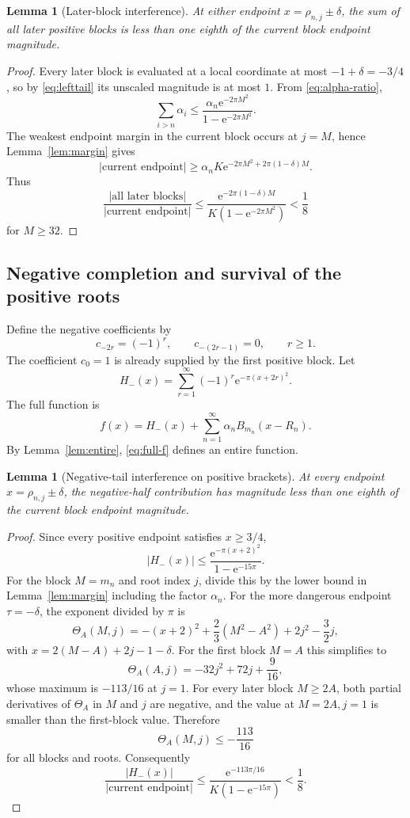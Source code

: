 \documentclass[11pt]{article}
\newtheorem{lemma}[theorem]{Lemma}
\newcommand{\e}{\mathrm{e}}
\begin{document}
\begin{lemma}[Later-block interference]\label{lem:later}
At either endpoint $x=\rho_{n,j}\pm\delta$, the sum of all later positive blocks is less than one eighth of the current block endpoint magnitude.
\end{lemma}

\begin{proof}
Every later block is evaluated at a local coordinate at most $-1+\delta=-3/4$, so by \eqref{eq:lefttail} its unscaled magnitude is at most $1$. From \eqref{eq:alpha-ratio},
\[
 \sum_{i>n}\alpha_i
 \le\frac{\alpha_n\e^{-2\pi M^2}}{1-\e^{-2\pi M^2}}.
\]
The weakest endpoint margin in the current block occurs at $j=M$, hence Lemma~\ref{lem:margin} gives
\[
 |\text{current endpoint}|\ge
 \alpha_nK\e^{-2\pi M^2+2\pi(1-\delta)M}.
\]
Thus
\[
 \frac{|\text{all later blocks}|}{|\text{current endpoint}|}
 \le
 \frac{\e^{-2\pi(1-\delta)M}}{K(1-\e^{-2\pi M^2})}<\frac18
\]
for $M\ge32$.
\end{proof}

\subsection{Negative completion and survival of the positive roots}
Define the negative coefficients by
\begin{equation}\label{eq:negative-c}
 c_{-2r}=(-1)^r,\qquad c_{-(2r-1)}=0,\qquad r\ge1.
\end{equation}
The coefficient $c_0=1$ is already supplied by the first positive block. Let
\[
 H_-(x)=\sum_{r=1}^{\infty}(-1)^r\e^{-\pi(x+2r)^2}.
\]
The full function is
\begin{equation}\label{eq:full-f}
 f(x)=H_-(x)+\sum_{n=1}^{\infty}\alpha_nB_{m_n}(x-R_n).
\end{equation}
By Lemma~\ref{lem:entire}, \eqref{eq:full-f} defines an entire function.

\begin{lemma}[Negative-tail interference on positive brackets]\label{lem:negative-tail}
At every endpoint $x=\rho_{n,j}\pm\delta$, the negative-half contribution has magnitude less than one eighth of the current block endpoint magnitude.
\end{lemma}

\begin{proof}
Since every positive endpoint satisfies $x\ge3/4$,
\[
 |H_-(x)|\le\frac{\e^{-\pi(x+2)^2}}{1-\e^{-15\pi}}.
\]
For the block $M=m_n$ and root index $j$, divide this by the lower bound in Lemma~\ref{lem:margin} including the factor $\alpha_n$. For the more dangerous endpoint $\tau=-\delta$, the exponent divided by $\pi$ is
\[
 \Theta_A(M,j)=-(x+2)^2+\frac23(M^2-A^2)+2j^2-\frac32j,
\]
with $x=2(M-A)+2j-1-\delta$. For the first block $M=A$ this simplifies to
\[
 \Theta_A(A,j)=-32j^2+72j+\frac9{16},
\]
whose maximum is $-113/16$ at $j=1$. For every later block $M\ge2A$, both partial derivatives of $\Theta_A$ in $M$ and $j$ are negative, and the value at $M=2A,j=1$ is smaller than the first-block value. Therefore
\[
 \Theta_A(M,j)\le-\frac{113}{16}
\]
for all blocks and roots. Consequently
\[
 \frac{|H_-(x)|}{|\text{current endpoint}|}
 \le\frac{\e^{-113\pi/16}}{K(1-\e^{-15\pi})}<\frac18.
\]
\end{proof}
\end{document}
